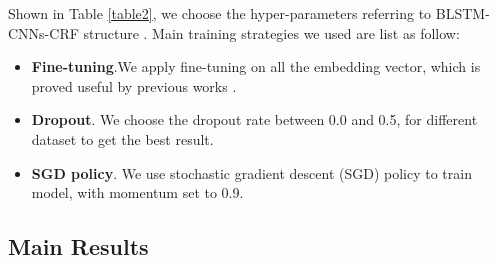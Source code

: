 \documentclass[letterpaper]{article} %
\begin{document}
Shown in Table \ref{table2}, we choose the hyper-parameters referring to BLSTM-CNNs-CRF structure \cite{mahovy}. Main training strategies we used are list as follow:

\begin{itemize}
\item \textbf{Fine-tuning}.We apply fine-tuning on all the embedding vector, which is proved useful by previous works \cite{nlp,peng15,mahovy}. 
\item \textbf{Dropout}. We choose the dropout rate between 0.0 and 0.5, for different dataset to get the best result.
\item \textbf{SGD policy}. We use stochastic gradient descent (SGD) policy to train model, with momentum set to 0.9.
\end{itemize}

\subsection{Main Results}

\begin{table}[t]
\caption{Main Results on Weibo NER.}\smallskip
\centering
{}
\label{table_weibo}
\end{table}

\begin{table}[t]
\caption{Main Results on ResumeNER.}\smallskip
\centering
{}
\label{table_resume}
\end{table}
\end{document}
